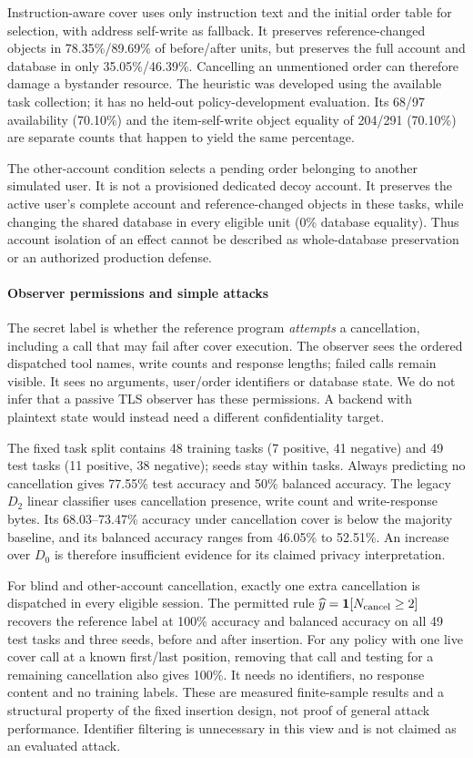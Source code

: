 Instruction-aware cover uses only instruction text and the initial order table for selection, with address self-write as fallback. It preserves reference-changed objects in 78.35\%/89.69\% of before/after units, but preserves the full account and database in only 35.05\%/46.39\%. Cancelling an unmentioned order can therefore damage a bystander resource. The heuristic was developed using the available task collection; it has no held-out policy-development evaluation. Its 68/97 availability (70.10\%) and the item-self-write object equality of 204/291 (70.10\%) are separate counts that happen to yield the same percentage.

The other-account condition selects a pending order belonging to another simulated user. It is not a provisioned dedicated decoy account. It preserves the active user's complete account and reference-changed objects in these tasks, while changing the shared database in every eligible unit (0\% database equality). Thus account isolation of an effect cannot be described as whole-database preservation or an authorized production defense.

\paragraph{Observer permissions and simple attacks}
The secret label is whether the reference program \emph{attempts} a cancellation, including a call that may fail after cover execution. The observer sees the ordered dispatched tool names, write counts and response lengths; failed calls remain visible. It sees no arguments, user/order identifiers or database state. We do not infer that a passive TLS observer has these permissions. A backend with plaintext state would instead need a different confidentiality target.

The fixed task split contains 48 training tasks (7 positive, 41 negative) and 49 test tasks (11 positive, 38 negative); seeds stay within tasks. Always predicting no cancellation gives 77.55\% test accuracy and 50\% balanced accuracy. The legacy $D_2$ linear classifier uses cancellation presence, write count and write-response bytes. Its 68.03--73.47\% accuracy under cancellation cover is below the majority baseline, and its balanced accuracy ranges from 46.05\% to 52.51\%. An increase over $D_0$ is therefore insufficient evidence for its claimed privacy interpretation.

For blind and other-account cancellation, exactly one extra cancellation is dispatched in every eligible session. The permitted rule $\widehat y=\mathbf{1}[N_{\rm cancel}\ge2]$ recovers the reference label at 100\% accuracy and balanced accuracy on all 49 test tasks and three seeds, before and after insertion. For any policy with one live cover call at a known first/last position, removing that call and testing for a remaining cancellation also gives 100\%. It needs no identifiers, no response content and no training labels. These are measured finite-sample results and a structural property of the fixed insertion design, not proof of general attack performance. Identifier filtering is unnecessary in this view and is not claimed as an evaluated attack.

